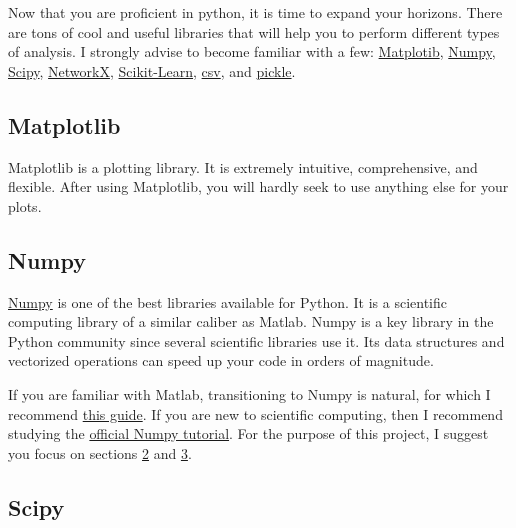 \documentclass[11pt]{article}
\begin{document}
Now that you are proficient in python, it is time to expand your horizons. There are tons of cool and useful libraries that will help you to perform different types of analysis. I strongly advise to become familiar with a few:  \href{http://matplotlib.org/users/pyplot_tutorial.html}{Matplotib}, \href{http://wiki.scipy.org/Tentative_NumPy_Tutorial}{Numpy}, \href{http://docs.scipy.org/doc/scipy/reference/tutorial/}{Scipy}, \href{http://networkx.github.io/documentation/latest/tutorial/}{NetworkX}, \href{http://scikit-learn.org/stable/tutorial/}{Scikit-Learn}, \href{https://docs.python.org/2/library/csv.html}{csv}, and \href{https://docs.python.org/2/library/pickle.html}{pickle}.



\subsection{Matplotlib}

Matplotlib is a plotting library. It is extremely intuitive, comprehensive, and flexible. After using Matplotlib, you will hardly seek to use anything else for your plots.



\subsection{Numpy}

\href{http://wiki.scipy.org/Tentative_NumPy_Tutorial}{Numpy} is one of the best libraries available for Python. It is a scientific computing library of a similar caliber as Matlab. Numpy is a key library in the Python community since several scientific libraries use it. Its data structures and vectorized operations can speed up your code in orders of magnitude.

If you are familiar with Matlab, transitioning to Numpy is natural, for which I recommend \href{http://mathesaurus.sourceforge.net/matlab-numpy.html}{this guide}. If you are new to scientific computing, then I recommend studying the \href{ttp://wiki.scipy.org/Tentative_NumPy_Tutorial}{official Numpy tutorial}. For the purpose of this project, I suggest you focus on sections \href{http://wiki.scipy.org/Tentative_NumPy_Tutorial#head-6a1bc005bd80e1b19f812e1e64e0d25d50f99fe2}{2} and \href{http://wiki.scipy.org/Tentative_NumPy_Tutorial#head-62ef2d3c0a5b4b7d6fdc48e4a60fe48b1ffe5006}{3}.




\subsection{Scipy}
\end{document}
